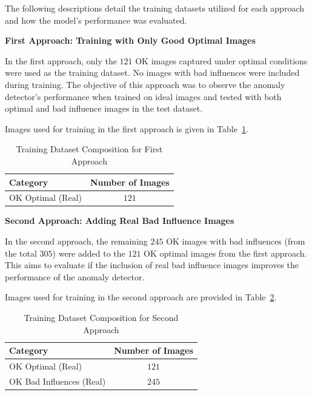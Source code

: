\documentclass[12pt,DIV14,BCOR12mm,a4paper,footinclude=false,headinclude,parskip=half-,twoside,openright,cleardoublepage=empty,toc=index,bibliography=totoc,listof=totoc]{scrreprt}
\numberwithin{equation}{chapter}
\begin{document}
The following descriptions detail the training datasets utilized for each approach and how the model's performance was evaluated.

\textbf{First Approach: Training with Only Good Optimal Images}

In the first approach, only the $121$ OK images captured under optimal conditions were used as the training dataset. No images with bad influences were included during training. The objective of this approach was to observe the anomaly detector’s performance when trained on ideal images and tested with both optimal and bad influence images in the test dataset.

Images used for training in the first approach is given in Table~\ref{tab:first-approach}.

\begin{table}
    \centering
    \caption{Training Dataset Composition for First Approach}
    \label{tab:first-approach}
    \begin{tabular}{lc} %
        \toprule
        \textbf{Category} & \textbf{Number of Images} \\ 
        \midrule
        OK Optimal (Real) & $121$ \\ 
        \bottomrule
    \end{tabular}
\end{table}

\textbf{Second Approach: Adding Real Bad Influence Images}

In the second approach, the remaining $245$ OK images with bad influences (from the total $305$) were added to the $121$ OK optimal images from the first approach. This aims to evaluate if the inclusion of real bad influence images improves the performance of the anomaly detector.

Images used for training in the second approach are provided in Table~\ref{tab:second-approach}.

\begin{table} 
    \centering
    \caption{Training Dataset Composition for Second Approach}
    \label{tab:second-approach}
    \begin{tabular}{lc} %
        \toprule
        \textbf{Category} & \textbf{Number of Images} \\ 
        \midrule
        OK Optimal (Real) & $121$ \\ 
        OK Bad Influences (Real) & $245$ \\ 
        \bottomrule
    \end{tabular}
\end{table}
\end{document}
